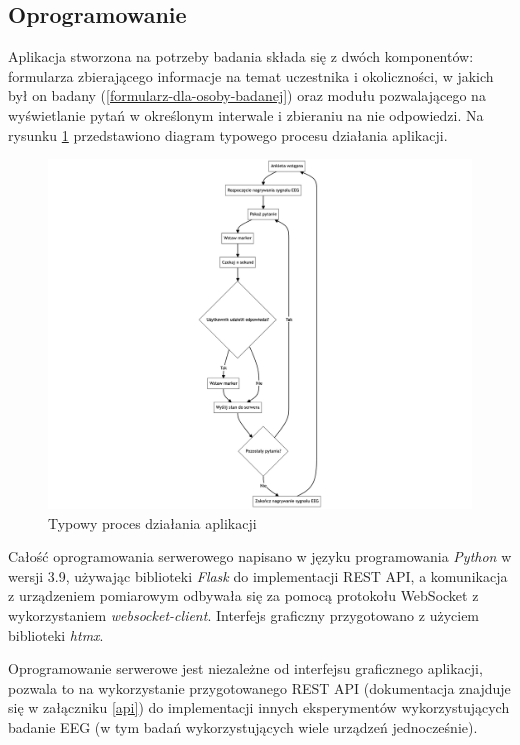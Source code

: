 \documentclass{./assets/wfis}
\begin{document}
\subsection{Oprogramowanie}
Aplikacja stworzona na potrzeby badania składa się z dwóch komponentów: formularza zbierającego informacje na temat uczestnika i okoliczności, w jakich był on badany (\autoref{formularz-dla-osoby-badanej}) oraz modułu pozwalającego na wyświetlanie pytań w określonym interwale i zbieraniu na nie odpowiedzi. Na rysunku \ref{fig:app-flow} przedstawiono diagram typowego procesu działania aplikacji.
\begin{figure}[h!]
    \centering
    \includegraphics[width=1\columnwidth]{thesis/assets/app_flow.png}
    \caption{Typowy proces działania aplikacji}
    \label{fig:app-flow}
\end{figure}
Całość oprogramowania serwerowego napisano w języku programowania \textit{Python}\cite{python_developers_python_2024} w wersji 3.9, używając biblioteki \textit{Flask}\cite{flask_developers_flask_nodate} do implementacji REST API, a komunikacja z urządzeniem pomiarowym odbywała się za pomocą protokołu WebSocket z wykorzystaniem \textit{websocket-client}\cite{liris_websocket-client_nodate}. Interfejs graficzny przygotowano z użyciem biblioteki \textit{htmx}\cite{htmx_developers_htmx_nodate}.

Oprogramowanie serwerowe jest niezależne od interfejsu graficznego aplikacji, pozwala to na wykorzystanie przygotowanego REST API (dokumentacja znajduje się w załączniku \ref{api}) do implementacji innych eksperymentów wykorzystujących badanie EEG (w tym badań wykorzystujących wiele urządzeń jednocześnie).
\end{document}
